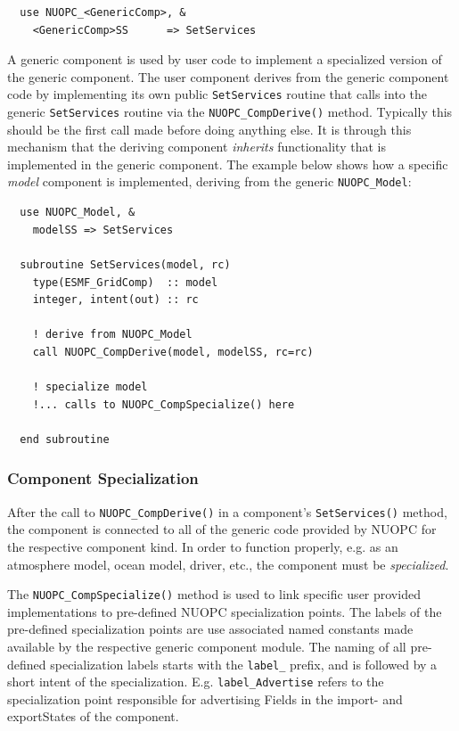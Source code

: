 \begin{verbatim}
  use NUOPC_<GenericComp>, &
    <GenericComp>SS      => SetServices
\end{verbatim}

A generic component is used by user code to implement a specialized version of the generic component. The user component derives from the generic component code by implementing its own public {\tt SetServices} routine that calls into the generic {\tt SetServices} routine via the {\tt NUOPC\_CompDerive()} method.
Typically this should be the first call made before doing anything else. It is through this mechanism that the deriving component {\em inherits} functionality that is implemented in the generic component. The example below shows how a specific {\em model} component is implemented, deriving from the generic {\tt NUOPC\_Model}:

\begin{verbatim}
  use NUOPC_Model, &
    modelSS => SetServices

  subroutine SetServices(model, rc)
    type(ESMF_GridComp)  :: model
    integer, intent(out) :: rc

    ! derive from NUOPC_Model
    call NUOPC_CompDerive(model, modelSS, rc=rc)

    ! specialize model
    !... calls to NUOPC_CompSpecialize() here
    
  end subroutine
\end{verbatim}

\subsubsection{Component Specialization}

After the call to {\tt NUOPC\_CompDerive()} in a component's {\tt SetServices()} method, the component is connected to all of the generic code provided by NUOPC for the respective component kind. In order to function properly, e.g. as an atmosphere model, ocean model, driver, etc., the component must be {\em specialized}.

The {\tt NUOPC\_CompSpecialize()} method is used to link specific user provided implementations to pre-defined NUOPC specialization points. The labels of the pre-defined specialization points are use associated named constants made available by the respective generic component module. The naming of all pre-defined specialization labels starts with the {\tt label\_} prefix, and is followed by a short intent of the specialization. E.g. {\tt label\_Advertise} refers to the specialization point responsible for advertising Fields in the import- and exportStates of the component.

